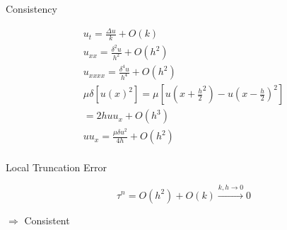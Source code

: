 Consistency

\begin{align*}
u_t= \frac{\Delta u}{k} + O(k) \\
u_{xx} = \frac{\delta^2 u}{h^2} + O(h^2) \\
u_{xxxx} = \frac{\delta^4 u}{h^4} + O(h^2) \\
\mu \delta [u(x)^2] = \mu[u(x+\frac{h}{2}^2) - u(x - \frac{h}{2})^2] \\
= 2huu_{x} + O(h^3) \\
uu_{x} = \frac{\mu \delta u^2}{4h} + O(h^2) \\
\end{align*}

Local Truncation Error

\begin{equation}
\tau ^n = O(h^2) + O(k) \xrightarrow{k,h \to 0} 0
\end{equation}

$\Rightarrow$ Consistent